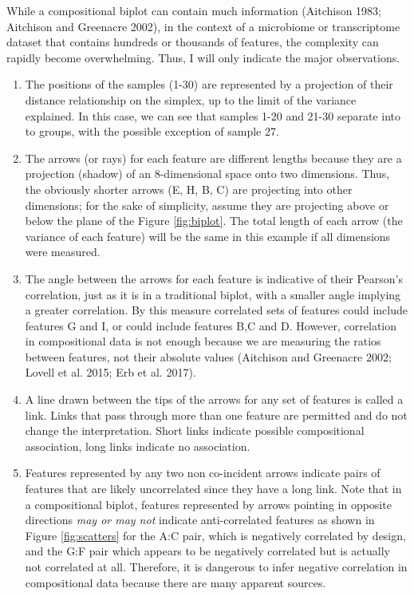\documentclass[onecolumn]{article}
\begin{document}
While a compositional biplot can contain much information (Aitchison 1983; Aitchison and Greenacre 2002), in the context of a microbiome or transcriptome dataset that contains hundreds or thousands of features, the complexity can rapidly become overwhelming. Thus, I will only indicate the major observations.

\begin{enumerate}
\def\labelenumi{\arabic{enumi}.}
\item
  The positions of the samples (1-30) are represented by a projection of their distance relationship on the simplex, up to the limit of the variance explained. In this case, we can see that samples 1-20 and 21-30 separate into to groups, with the possible exception of sample 27.
\item
  The arrows (or rays) for each feature are different lengths because they are a projection (shadow) of an 8-dimensional space onto two dimensions. Thus, the obviously shorter arrows (E, H, B, C) are projecting into other dimensions; for the sake of simplicity, assume they are projecting above or below the plane of the Figure \ref{fig:biplot}. The total length of each arrow (the variance of each feature) will be the same in this example if all dimensions were measured.
\item
  The angle between the arrows for each feature is indicative of their Pearson's correlation, just as it is in a traditional biplot, with a smaller angle implying a greater correlation. By this measure correlated sets of features could include features G and I, or could include features B,C and D. However, correlation in compositional data is not enough because we are measuring the ratios between features, not their absolute values (Aitchison and Greenacre 2002; Lovell et al. 2015; Erb et al. 2017).
\item
  A line drawn between the tips of the arrows for any set of features is called a link. Links that pass through more than one feature are permitted and do not change the interpretation. Short links indicate possible compositional association, long links indicate no association.
\item
  Features represented by any two non co-incident arrows indicate pairs of features that are likely uncorrelated since they have a long link. Note that in a compositional biplot, features represented by arrows pointing in opposite directions \emph{may or may not} indicate anti-correlated features as shown in Figure \ref{fig:scatters} for the A:C pair, which is negatively correlated by design, and the G:F pair which appears to be negatively correlated but is actually not correlated at all. Therefore, it is dangerous to infer negative correlation in compositional data because there are many apparent sources.

\end{enumerate}
\end{document}
